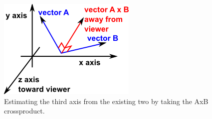 \begin{figure}[H]
\center
\includegraphics{pics/crossProduct.png}
\caption{Estimating the third axis from the existing two by taking the AxB crossproduct.}
\label{cross_product}
\end{figure}
